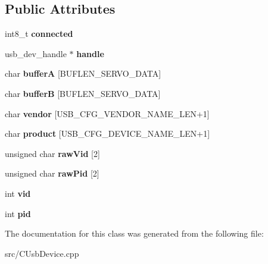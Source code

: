 \subsection*{Public Attributes}
\begin{DoxyCompactItemize}
\item 
\hypertarget{class_c_usb_device_afcc522725a5d775d178a972bef89961e}{
int8\_\-t {\bfseries connected}}
\label{class_c_usb_device_afcc522725a5d775d178a972bef89961e}

\item 
\hypertarget{class_c_usb_device_a575ceacaba612e42aa56e030a19085b3}{
usb\_\-dev\_\-handle $\ast$ {\bfseries handle}}
\label{class_c_usb_device_a575ceacaba612e42aa56e030a19085b3}

\item 
\hypertarget{class_c_usb_device_a9940b60a5545b5f26a2f83573ef0ea33}{
char {\bfseries bufferA} \mbox{[}BUFLEN\_\-SERVO\_\-DATA\mbox{]}}
\label{class_c_usb_device_a9940b60a5545b5f26a2f83573ef0ea33}

\item 
\hypertarget{class_c_usb_device_ad982a23b2ea28a3230e4f491ce9b39f5}{
char {\bfseries bufferB} \mbox{[}BUFLEN\_\-SERVO\_\-DATA\mbox{]}}
\label{class_c_usb_device_ad982a23b2ea28a3230e4f491ce9b39f5}

\item 
\hypertarget{class_c_usb_device_ac79f1c8a02bd3a08fe7734cbd9cb1cb5}{
char {\bfseries vendor} \mbox{[}USB\_\-CFG\_\-VENDOR\_\-NAME\_\-LEN+1\mbox{]}}
\label{class_c_usb_device_ac79f1c8a02bd3a08fe7734cbd9cb1cb5}

\item 
\hypertarget{class_c_usb_device_a396e47f59dca2d540cc543b667b1bcf6}{
char {\bfseries product} \mbox{[}USB\_\-CFG\_\-DEVICE\_\-NAME\_\-LEN+1\mbox{]}}
\label{class_c_usb_device_a396e47f59dca2d540cc543b667b1bcf6}

\item 
\hypertarget{class_c_usb_device_aad5687c56f3574918fd6240ef67371f3}{
unsigned char {\bfseries rawVid} \mbox{[}2\mbox{]}}
\label{class_c_usb_device_aad5687c56f3574918fd6240ef67371f3}

\item 
\hypertarget{class_c_usb_device_a00dbd139727d46ca716f245d34753bc6}{
unsigned char {\bfseries rawPid} \mbox{[}2\mbox{]}}
\label{class_c_usb_device_a00dbd139727d46ca716f245d34753bc6}

\item 
\hypertarget{class_c_usb_device_a429212758f999036aab9338228230546}{
int {\bfseries vid}}
\label{class_c_usb_device_a429212758f999036aab9338228230546}

\item 
\hypertarget{class_c_usb_device_aedf9528f9be39140c00e46d305b496e7}{
int {\bfseries pid}}
\label{class_c_usb_device_aedf9528f9be39140c00e46d305b496e7}

\end{DoxyCompactItemize}


The documentation for this class was generated from the following file:\begin{DoxyCompactItemize}
\item 
src/CUsbDevice.cpp\end{DoxyCompactItemize}
